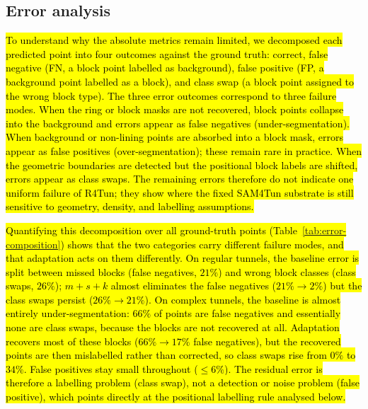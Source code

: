 
\subsection{Error analysis}\label{sec:error-analysis}

\hl{To understand why the absolute metrics remain limited, we decomposed each predicted point into four outcomes against the ground truth: correct, false negative (FN, a block point labelled as background), false positive (FP, a background point labelled as a block), and class swap (a block point assigned to the wrong block type). The three error outcomes correspond to three failure modes. When the ring or block masks are not recovered, block points collapse into the background and errors appear as false negatives (under-segmentation). When background or non-lining points are absorbed into a block mask, errors appear as false positives (over-segmentation); these remain rare in practice. When the geometric boundaries are detected but the positional block labels are shifted, errors appear as class swaps. The remaining errors therefore do not indicate one uniform failure of R4Tun; they show where the fixed SAM4Tun substrate is still sensitive to geometry, density, and labelling assumptions.}

\hl{Quantifying this decomposition over all ground-truth points (Table~\ref{tab:error-composition}) shows that the two categories carry different failure modes, and that adaptation acts on them differently. On regular tunnels, the baseline error is split between missed blocks (false negatives, $21\%$) and wrong block classes (class swaps, $26\%$); \mbox{$m+s+k$} almost eliminates the false negatives ($21\%\rightarrow2\%$) but the class swaps persist ($26\%\rightarrow21\%$). On complex tunnels, the baseline is almost entirely under-segmentation: $66\%$ of points are false negatives and essentially none are class swaps, because the blocks are not recovered at all. Adaptation recovers most of these blocks ($66\%\rightarrow17\%$ false negatives), but the recovered points are then mislabelled rather than corrected, so class swaps rise from $0\%$ to $34\%$. False positives stay small throughout ($\leq6\%$). The residual error is therefore a labelling problem (class swap), not a detection or noise problem (false positive), which points directly at the positional labelling rule analysed below.}

